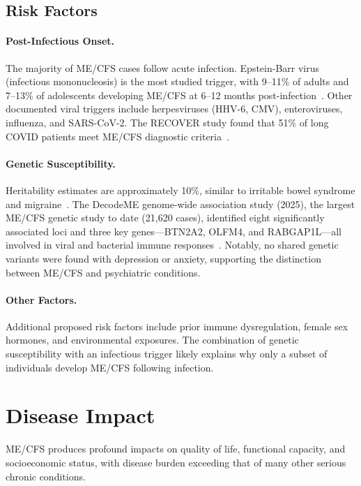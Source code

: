 \subsection{Risk Factors}
\label{subsec:risk-factors}

\paragraph{Post-Infectious Onset.}
The majority of ME/CFS cases follow acute infection. Epstein-Barr virus (infectious mononucleosis) is the most studied trigger, with 9--11\% of adults and 7--13\% of adolescents developing ME/CFS at 6--12 months post-infection~\cite{Hickie2006postinfectious}. Other documented viral triggers include herpesviruses (HHV-6, CMV), enteroviruses, influenza, and SARS-CoV-2. The RECOVER study found that 51\% of long COVID patients meet ME/CFS diagnostic criteria~\cite{RECOVER2025}.

\paragraph{Genetic Susceptibility.}
Heritability estimates are approximately 10\%, similar to irritable bowel syndrome and migraine~\cite{Dibble2020genetics}. The DecodeME genome-wide association study (2025), the largest ME/CFS genetic study to date (21,620 cases), identified eight significantly associated loci and three key genes---BTN2A2, OLFM4, and RABGAP1L---all involved in viral and bacterial immune responses~\cite{DecodeME2025}. Notably, no shared genetic variants were found with depression or anxiety, supporting the distinction between ME/CFS and psychiatric conditions.

\paragraph{Other Factors.}
Additional proposed risk factors include prior immune dysregulation, female sex hormones, and environmental exposures. The combination of genetic susceptibility with an infectious trigger likely explains why only a subset of individuals develop ME/CFS following infection.

\section{Disease Impact}
\label{sec:impact}

ME/CFS produces profound impacts on quality of life, functional capacity, and socioeconomic status, with disease burden exceeding that of many other serious chronic conditions.


